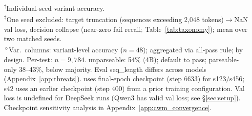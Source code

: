 \begin{table}[t]
\centering
\small
\caption{Repo-level cross-formulation comparison on SWE-bench Verified test set. Qwen3-8B \cls{}/\traj{}: mean $\pm$ std over 3 seeds; DeepSeek \cls{}: 2 seeds\textsuperscript{$\ddagger$}; DeepSeek \traj{}: 3 seeds; Qwen3-4B: seed 42. \cwm{}: 3 seeds (42/123/456).}
\label{tab:repo_level}

\vspace{2pt}
{\footnotesize
\textsuperscript{$\dagger$}Individual-seed variant accuracy.\\
\textsuperscript{$\ddagger$}One seed excluded: target truncation (sequences exceeding 2,048 tokens)$\to$NaN val loss, decision collapse (near-zero fail recall; Table~\ref{tab:taxonomy}); mean over two matched seeds.\\
\textsuperscript{$\diamond$}Var.\ columns: variant-level accuracy ($n{=}48$); \cls{} aggregated via all-pass rule; \traj{} by design. Per-test: $n{=}9{,}784$. \cwm{} unparseable: 54\% (4B); default to pass; parseable-only 38--43\%, below majority. Eval seq\_length differs across models (Appendix~\ref{app:threats}). \cwm{} uses final-epoch checkpoint (step 6633) for s123/s456; s42 uses an earlier checkpoint (step 400) from a prior training configuration. Val loss is undefined for DeepSeek \cwm{} runs (Qwen3 \cwm{} has valid val loss; see \S\ref{sec:setup}). Checkpoint sensitivity analysis in Appendix~\ref{app:cwm_convergence}.}
\end{table}

